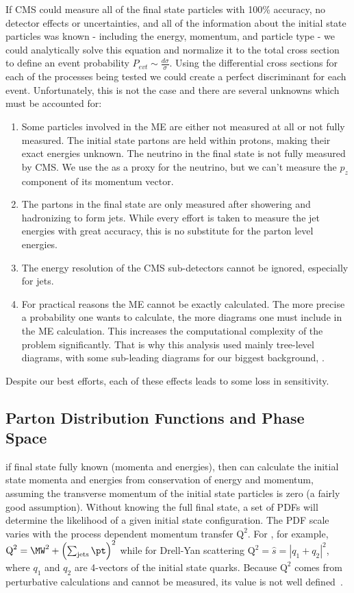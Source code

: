 If CMS could measure all of the final state particles with 100\% accuracy, no detector effects or uncertainties, and all of the information about the initial state particles was known - including the energy, momentum, and particle type - we could analytically solve this equation and normalize it to the total cross section to define an event probability $P_{evt}\sim\frac{d\sigma}{\sigma}$.
Using the differential cross sections for each of the processes being tested we could create a perfect discriminant for each event.
Unfortunately, this is not the case and there are several unknowns which must be accounted for:
\begin{enumerate}
  \item Some particles involved in the ME are either not measured at all or not fully measured. The initial state partons are held within protons, making their exact energies unknown. The neutrino in the final state is not fully measured by CMS. We use the \ETslash as a proxy for the neutrino, but we can't measure the $p_{z}$ component of its momentum vector.
  \item The partons in the final state are only measured after showering and hadronizing to form jets. While every effort is taken to measure the jet energies with great accuracy, this is no substitute for the parton level energies.
  \item The energy resolution of the CMS sub-detectors cannot be ignored, especially for jets.
  \item For practical reasons the ME cannot be exactly calculated. The more precise a probability one wants to calculate, the more diagrams one must include in the ME calculation. This increases the computational complexity of the problem significantly. That is why this analysis used mainly tree-level diagrams, with some sub-leading diagrams for our biggest background, \Wjets.
\end{enumerate}
Despite our best efforts, each of these effects leads to some loss in sensitivity.

\subsection{Parton Distribution Functions and Phase Space}

if final state fully known (momenta and energies), then can calculate the initial state momenta and energies from conservation of energy and momentum, assuming the transverse momentum of the initial state particles is zero (a fairly good assumption).
Without knowing the full final state, a set of PDFs will determine the likelihood of a given initial state configuration.
The PDF scale varies with the process dependent momentum transfer $\text{Q}^{2}$.
For \Wjets, for example, $\text{Q}^{2}=\MW^{2}+\left(\sum_{\text{jets}}\pt\right)^{2}$ while for Drell-Yan scattering $\text{Q}^{2}=\hat{s}=|q_{1}+q_{2}|^{2}$, where $q_{1}$ and $q_{2}$ are 4-vectors of the initial state quarks.
Because $\text{Q}^{2}$ comes from perturbative calculations and cannot be measured, its value is not well defined~\cite{Dong2008}.

